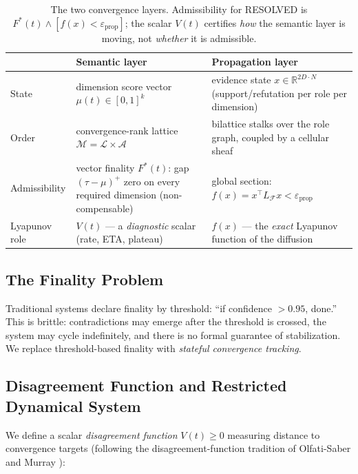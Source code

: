 \documentclass[11pt]{article}
\begin{document}
\begin{table}[H]
\centering
\small
\begin{tabular}{p{2.4cm}p{4.6cm}p{4.6cm}}
\toprule
 & \textbf{Semantic layer} & \textbf{Propagation layer} \\
\midrule
State & dimension score vector $\mu(t) \in [0,1]^k$ & evidence state $x \in \mathbb{R}^{2D\cdot N}$ (support/refutation per role per dimension) \\
Order & convergence-rank lattice $\mathcal{M} = \mathcal{L}\times\mathcal{A}$ & bilattice stalks over the role graph, coupled by a cellular sheaf \\
Admissibility & vector finality $F^*(t)$: gap $(\tau-\mu)^+$ zero on every required dimension (non-compensable) & global section: $f(x) = x^\top L_{\mathcal{F}} x < \varepsilon_{\mathrm{prop}}$ \\
Lyapunov role & $V(t)$ --- a \emph{diagnostic} scalar (rate, ETA, plateau) & $f(x)$ --- the \emph{exact} Lyapunov function of the diffusion \\
\bottomrule
\end{tabular}
\caption{The two convergence layers. Admissibility for RESOLVED is $F^*(t) \wedge [f(x) < \varepsilon_{\mathrm{prop}}]$; the scalar $V(t)$ certifies \emph{how} the semantic layer is moving, not \emph{whether} it is admissible.}
\label{tab:two-layer}
\end{table}

\subsection{The Finality Problem}

Traditional systems declare finality by threshold: ``if confidence $> 0.95$, done.'' This is brittle: contradictions may emerge after the threshold is crossed, the system may cycle indefinitely, and there is no formal guarantee of stabilization. We replace threshold-based finality with \emph{stateful convergence tracking}.

\subsection{Disagreement Function and Restricted Dynamical System}
\label{sec:convergence-guarantee}

We define a scalar \emph{disagreement function} $V(t) \geq 0$ measuring distance to convergence targets (following the disagreement-function tradition of Olfati-Saber and Murray \cite{olfati2004}):
\end{document}
